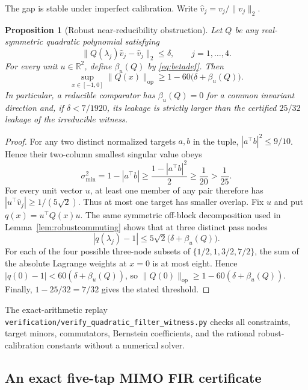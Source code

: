 \documentclass[11pt]{article}
\newtheorem{proposition}[theorem]{Proposition}
\theoremstyle{remark}
\newcommand{\R}{\mathbb{R}}
\newcommand{\op}{\mathrm{op}}
\begin{document}
The gap is stable under imperfect calibration.  Write
$\widehat v_j=v_j/\|v_j\|_2$.

\begin{proposition}[Robust near-reducibility obstruction]\label{prop:robustquadratic}
Let $Q$ be any real-symmetric quadratic polynomial satisfying
\[
 \|Q(\lambda_j)\widehat v_j-\widehat v_j\|_2\le\delta,
 \qquad j=1,\ldots,4.
\]
For every unit $u\in\R^2$, define $\beta_u(Q)$ by \eqref{eq:betadef}.  Then
\[
 \sup_{x\in[-1,0]}\|Q(x)\|_{\op}
 \ge 1-60\bigl(\delta+\beta_u(Q)\bigr).
\]
In particular, a reducible comparator has $\beta_u(Q)=0$ for a common
invariant direction and, if $\delta<7/1920$, its leakage is strictly larger
than the certified $25/32$ leakage of the irreducible witness.
\end{proposition}

\begin{proof}
For any two distinct normalized targets $a,b$ in the tuple,
$|a^\top b|^2\le9/10$.  Hence their two-column smallest singular value obeys
\[
 \sigma_{\min}^2=1-|a^\top b|
 \ge\frac{1-|a^\top b|^2}{2}\ge\frac1{20}>\frac1{25}.
\]
For every unit vector $u$, at least one member of any pair therefore has
$|u^\top\widehat v_j|\ge1/(5\sqrt2)$.  Thus at most one target has smaller
overlap.
Fix $u$ and put $q(x)=u^\top Q(x)u$.  The same symmetric off-block
decomposition used in Lemma~\ref{lem:robustcommuting} shows that at three
distinct pass nodes
\[
 |q(\lambda_j)-1|\le5\sqrt2\bigl(\delta+\beta_u(Q)\bigr).
\]
For each of the four possible three-node subsets of
$\{1/2,1,3/2,7/2\}$, the sum of the absolute Lagrange weights at $x=0$ is
at most eight.  Hence
$|q(0)-1|<60(\delta+\beta_u(Q))$, so
$\|Q(0)\|_{\op}\ge1-60(\delta+\beta_u(Q))$.  Finally,
$1-25/32=7/32$ gives the stated threshold.
\end{proof}

The exact-arithmetic replay
\texttt{verification/verify\_quadratic\_filter\_witness.py} checks all
constraints, target minors, commutators, Bernstein coefficients, and the
rational robust-calibration constants without a numerical solver.

\subsection{An exact five-tap MIMO FIR certificate}
\end{document}
